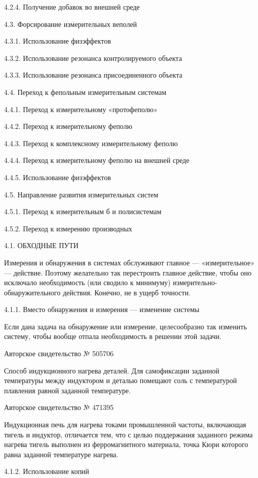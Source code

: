 4.2.4. Получение добавок во внешней среде

4.3. Форсирование измерительных веполей

4.3.1. Использование физэффектов

4.3.2. Использование резонанса контролируемого объекта

4.3.3. Использование резонанса присоединенного объекта

4.4. Переход к фепольным измерительным системам

4.4.1. Переход к измерительному «протофеполю»

4.4.2. Переход к измерительному феполю

4.4.3. Переход к комплексному измерительному феполю


4.4.4. Переход к измерительному феполю на внешней среде

4.4.5. Использование физэффектов

4.5. Направление развития измерительных систем

4.5.1. Переход к измерительным б и полисистемам

4.5.2. Переход к измерению производных


4.1. ОБХОДНЫЕ ПУТИ

Измерения   и   обнаружения   в   системах   обслуживают   главное   —
«измерительное» — действие. Поэтому желательно так перестроить главное
действие, чтобы  оно исключало необходимость (или  сводило к минимуму)
измерительно-обнаружительного действия. Конечно, не в ущерб точности.

4.1.1. Вместо обнаружения и измерения — изменение системы

Если  дана  задача на  обнаружение  или  измерение, целесообразно  так
изменить  систему, чтобы  вообще отпала  необходимость в  решении этой
задачи.


Авторское свидетельство № 505706

Способ  индукционного  нагрева   деталей.  Для  самофиксации  заданной
температуры между  индуктором и  деталью помещают соль  с температурой
плавления равной заданной температуре.


Авторское свидетельство № 471395

Индукционная печь для нагрева  токами промышленной частоты, включающая
тигель и индуктор,  отличается тем, что с  целью поддержания заданного
режима  нагрева тигель  выполнен из  ферромагнитного материала,  точка
Кюри которого равна заданной температуре нагрева.


4.1.2. Использование копий

